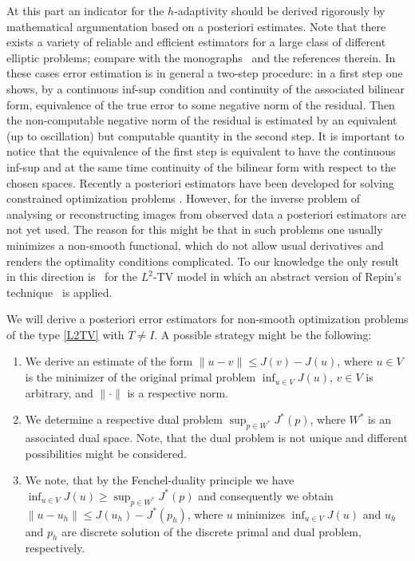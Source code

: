 \documentclass[enabledeprecatedfontcommands,cleardoublepage=empty,headsepline,twoside,11pt,DIV=15,BCOR=12mm,final]{scrartcl}
\begin{document}
  At this part an indicator for the $h$-adaptivity should be derived rigorously by mathematical argumentation based on a posteriori estimates. Note that there exists a variety of reliable and efficient estimators for a large class of different elliptic problems; compare with the monographs~\cite{AinOde,Ciarlet:02,Verfurth:96} and the references therein. In these cases error estimation is in general a two-step procedure: in a first step one shows, by a continuous inf-sup condition and continuity of the associated bilinear form, equivalence of the true error to some negative norm of the residual. Then the non-computable negative norm of the residual is estimated by an equivalent (up to oscillation) but computable quantity in the second step. It is important to notice that the equivalence of the first step is equivalent to have the continuous inf-sup and at the same time continuity of the bilinear form with respect to the chosen spaces. Recently a posteriori estimators have been developed for solving constrained optimization problems \cite{KoRoSi:14}. However, for the inverse problem of analysing or reconstructing images from observed data a posteriori estimators are not yet used. The reason for this might be that in such problems one usually minimizes a non-smooth functional, which do not allow usual derivatives and renders the optimality conditions complicated. To our knowledge the only result in this direction is~\cite{Bar2015} for the $L^2$-TV model in which an abstract version of Repin's technique~\cite{Repin} is applied.
 
 We will derive a posteriori error estimators for non-smooth optimization problems of the type \eqref{L2TV} with $T\not= I$. A possible strategy might be the following: 
\begin{enumerate}[1.]
\item We derive an estimate of the form $\|u -v \| \leq J(v) - J(u)$, where $u\in V$ is the minimizer of the original primal problem $\inf_{u\in V} J(u)$, $v\in V$ is arbitrary, and $\|\cdot\|$ is a respective norm.
\item We determine a respective dual problem $\sup_{p\in W^*} J^*(p)$, where $W^*$ is an associated dual space. Note, that the dual problem is not unique and different possibilities might be considered. %
\item We note, that by the Fenchel-duality principle we have $\inf_{u\in V} J(u)\geq \sup_{p\in W^*} J^*(p)$ and consequently we obtain $\|u -u_h \| \leq J(u_h) - J^*(p_h)$, where $u$ minimizes  $\inf_{u\in V} J(u)$ and $u_h$ and $p_h$ are discrete solution of the discrete primal and dual problem, respectively. 
\end{enumerate} 
\end{document}
